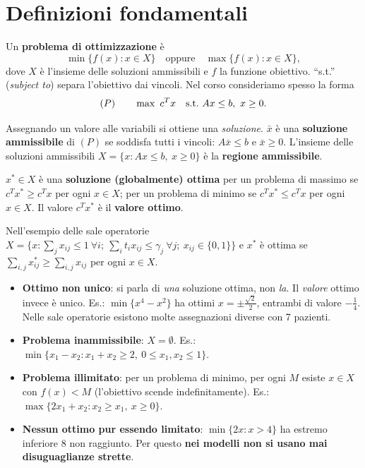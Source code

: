 \section{Definizioni fondamentali}\label{sec:def}

Un \textbf{problema di ottimizzazione} è
\[ \min\{f(x): x\in X\}\quad\text{oppure}\quad \max\{f(x):x\in X\},\]
dove $X$ è l'insieme delle soluzioni ammissibili e $f$ la funzione obiettivo. ``s.t.'' (\emph{subject to}) separa l'obiettivo dai vincoli. Nel corso consideriamo spesso la forma
\[ (P)\qquad \max\ c^T x\quad \text{s.t.}\ Ax\le b,\ x\ge 0. \]

\begin{defbox}
Assegnando un valore alle variabili si ottiene una \emph{soluzione}. $\bar x$ è una \textbf{soluzione ammissibile} di $(P)$ se soddisfa tutti i vincoli: $A\bar x\le b$ e $\bar x\ge 0$. L'insieme delle soluzioni ammissibili $X=\{x: Ax\le b,\ x\ge 0\}$ è la \textbf{regione ammissibile}.
\end{defbox}

\begin{defbox}
$x^*\in X$ è una \textbf{soluzione (globalmente) ottima} per un problema di massimo se $c^Tx^*\ge c^Tx$ per ogni $x\in X$; per un problema di minimo se $c^Tx^*\le c^Tx$ per ogni $x\in X$. Il valore $c^Tx^*$ è il \textbf{valore ottimo}.
\end{defbox}

Nell'esempio delle sale operatorie
$X=\big\{x: \sum_{j}x_{ij}\le 1\ \forall i;\ \sum_i t_ix_{ij}\le \gamma_j\ \forall j;\ x_{ij}\in\{0,1\}\big\}$ e $x^*$ è ottima se $\sum_{i,j}x^*_{ij}\ge \sum_{i,j}x_{ij}$ per ogni $x\in X$.

\begin{oss}
\begin{itemize}[nosep]
\item \textbf{Ottimo non unico}: si parla di \emph{una} soluzione ottima, non \emph{la}. Il \emph{valore} ottimo invece è unico. Es.: $\min\{x^4-x^2\}$ ha ottimi $x=\pm\frac{\sqrt2}{2}$, entrambi di valore $-\tfrac14$. Nelle sale operatorie esistono molte assegnazioni diverse con 7 pazienti.
\item \textbf{Problema inammissibile}: $X=\emptyset$. Es.: $\min\{x_1-x_2: x_1+x_2\ge 2,\ 0\le x_1,x_2\le 1\}$.
\item \textbf{Problema illimitato}: per un problema di minimo, per ogni $M$ esiste $x\in X$ con $f(x)< M$ (l'obiettivo scende indefinitamente). Es.: $\max\{2x_1+x_2: x_2\ge x_1,\ x\ge 0\}$.
\item \textbf{Nessun ottimo pur essendo limitato}: $\min\{2x: x>4\}$ ha estremo inferiore 8 non raggiunto. Per questo \textbf{nei modelli non si usano mai disuguaglianze strette}.
\end{itemize}
\end{oss}

